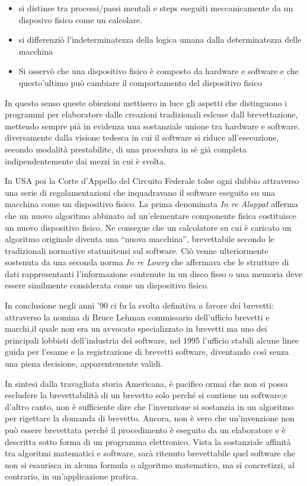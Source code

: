 \begin{itemize}
	\item si distinse tra processi/passi mentali e steps eseguiti meccanicamente da un disposivo fisico come un calcolare.
	\item si differenziò l'indeterminatezza della logica umana dalla determinatezza delle macchina
	\item Si osservò che una dispositivo fisico è composto da hardware e software e che questo'ultimo può cambiare il comportamento del dispositivo fisico
\end{itemize}
In questo senso queste obiezioni mettisero in luce gli aspetti che distinguono i programmi per elaboratore dalle creazioni tradizionali eslcuse dall brevettazione, mettendo sempre pià in evidenza una sostanziale unione tra hardware e software. diversamente dalla visione tedesca in cui il software si riduce all'esecuzione, secondo modalità prestabilite, di una procedura in sè già completa indipendentemente dai mezzi in cui è svolta.

In USA poi la Corte d'Appello del Circuito Federale tolse ogni dubbio attraverso una serie di regolamentazioni che inquadravano il software eseguito su una macchina come un dispositivo fisico. La prima denominata \textit{In re Alappat} afferma che un nuovo algoritmo abbinato ad un'elementare componente fisica costituisce un nuovo dispositivo fisico. Ne consegue che un calcolatore su cui è caricato un algoritmo originale diventa una ``nuova macchina'', brevettabile secondo le tradizionali normative statunitensi sul software. Ciò venne ulteriormente sostenuta da una seconda norma \textit{In re Lowry} che affermava che le strutture di dati rappresentanti l'informazione contenute in un disco fisso o una memoria deve essere similmente considerata come un dispositivo fisico.

In conclusione negli anni '90 ci fu la svolta definitiva a favore dei brevetti: attraverso la nomina di Bruce Lehman commissario dell'ufficio brevetti e marchi,il quale non era un avvocato specializzato in brevetti ma uno dei principali lobbisti dell'industria del software, nel 1995 l'ufficio stabilì alcune linee guida per l'esame e la registrazione di brevetti software, diventando così senza una piena decisione, apparentemente validi.

In sintesi dalla travagliata storia Americana, è pacifico ormai che non si possa escludere la brevettabilità di un brevetto solo perché si contiene un software;e d'altro canto, non è sufficiente dire che l'invenzione si sostanzia in un algoritmo per rigettare la domanda di brevetto. Ancora, non è vero che un'invenzione non può essere brevettata perché il procedimento è eseguito da un elaboratore e è descritta sotto forma di un programma elettronico. Vista la sostanziale affinità tra algoritmi matematici e software, sarà ritenuto brevettabile quel software che non si esaurisca in alcuna formula o algoritmo matematico, ma si concretizzi, al contrario, in un'applicazione pratica.

